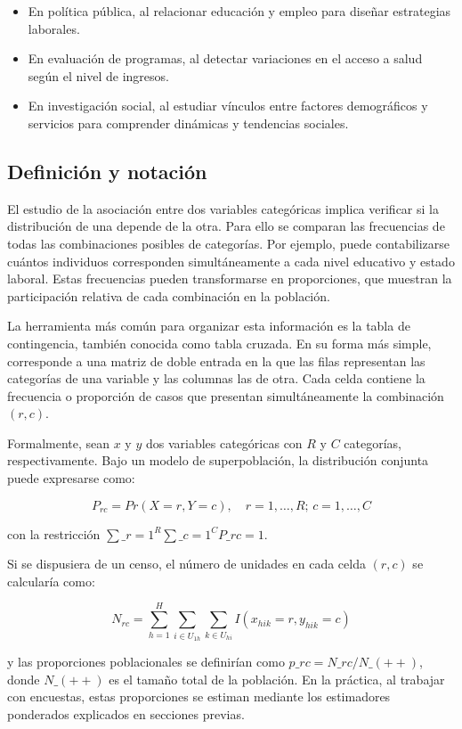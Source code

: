 \documentclass[
  spanish,
  12pt,
]{book}
\providecommand{\tightlist}{%
  \setlength{\itemsep}{0pt}\setlength{\parskip}{0pt}}
\begin{document}
\begin{itemize}
\tightlist
\item
  En política pública, al relacionar educación y empleo para diseñar estrategias laborales.
\item
  En evaluación de programas, al detectar variaciones en el acceso a salud según el nivel de ingresos.
\item
  En investigación social, al estudiar vínculos entre factores demográficos y servicios para comprender dinámicas y tendencias sociales.
\end{itemize}

\subsection{Definición y notación}\label{definiciuxf3n-y-notaciuxf3n}

El estudio de la asociación entre dos variables categóricas implica verificar si la distribución de una depende de la otra. Para ello se comparan las frecuencias de todas las combinaciones posibles de categorías. Por ejemplo, puede contabilizarse cuántos individuos corresponden simultáneamente a cada nivel educativo y estado laboral. Estas frecuencias pueden transformarse en proporciones, que muestran la participación relativa de cada combinación en la población.

La herramienta más común para organizar esta información es la tabla de contingencia, también conocida como tabla cruzada. En su forma más simple, corresponde a una matriz de doble entrada en la que las filas representan las categorías de una variable y las columnas las de otra. Cada celda contiene la frecuencia o proporción de casos que presentan simultáneamente la combinación \((r,c)\).

Formalmente, sean \(x\) y \(y\) dos variables categóricas con \(R\) y \(C\) categorías, respectivamente. Bajo un modelo de superpoblación, la distribución conjunta puede expresarse como:

\[
P_{rc} = Pr(X=r, Y=c), \quad r=1,\dots,R;\, c=1,\dots,C
\tag{9-24}
\]

con la restricción \(\sum\_{r=1}^{R}\sum\_{c=1}^{C} P\_{rc}=1\).

Si se dispusiera de un censo, el número de unidades en cada celda \((r,c)\) se calcularía como:

\[
N_{rc} = \sum_{h=1}^{H} \sum_{i \in U_{1h}} \sum_{k \in U_{hi}} I(x_{hik}=r, y_{hik}=c) 
\tag{9-25}
\]

y las proporciones poblacionales se definirían como \(p\_{rc} = N\_{rc}/N\_{(++)}\), donde \(N\_{(++)}\) es el tamaño total de la población. En la práctica, al trabajar con encuestas, estas proporciones se estiman mediante los estimadores ponderados explicados en secciones previas.
\end{document}
